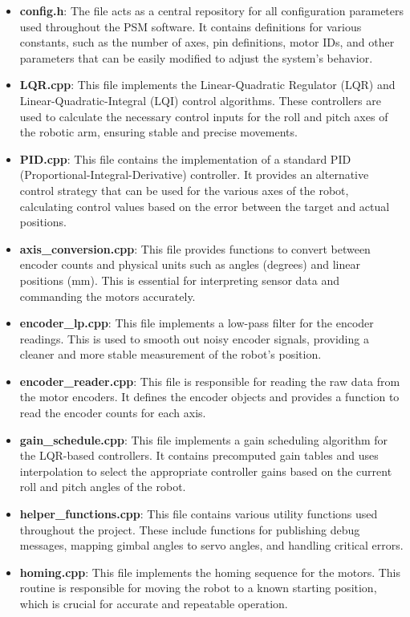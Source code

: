 \begin{itemize}
    \item \textbf{config.h}: The file acts as a central repository for all configuration parameters used throughout the PSM software. It contains definitions for various constants, such as the number of axes, pin definitions, motor IDs, and other parameters that can be easily modified to adjust the system's behavior.
    \item \textbf{LQR.cpp}: This file implements the Linear-Quadratic Regulator (LQR) and Linear-Quadratic-Integral (LQI) control algorithms. These controllers are used to calculate the necessary control inputs for the roll and pitch axes of the robotic arm, ensuring stable and precise movements.
    \item \textbf{PID.cpp}: This file contains the implementation of a standard PID (Proportional-Integral-Derivative) controller. It provides an alternative control strategy that can be used for the various axes of the robot, calculating control values based on the error between the target and actual positions.
    \item \textbf{axis\_conversion.cpp}: This file provides functions to convert between encoder counts and physical units such as angles (degrees) and linear positions (mm). This is essential for interpreting sensor data and commanding the motors accurately.
    \item \textbf{encoder\_lp.cpp}: This file implements a low-pass filter for the encoder readings. This is used to smooth out noisy encoder signals, providing a cleaner and more stable measurement of the robot's position.
    \item \textbf{encoder\_reader.cpp}: This file is responsible for reading the raw data from the motor encoders. It defines the encoder objects and provides a function to read the encoder counts for each axis.
    \item \textbf{gain\_schedule.cpp}: This file implements a gain scheduling algorithm for the LQR-based controllers. It contains precomputed gain tables and uses interpolation to select the appropriate controller gains based on the current roll and pitch angles of the robot.
    \item \textbf{helper\_functions.cpp}: This file contains various utility functions used throughout the project. These include functions for publishing debug messages, mapping gimbal angles to servo angles, and handling critical errors.
    \item \textbf{homing.cpp}: This file implements the homing sequence for the motors. This routine is responsible for moving the robot to a known starting position, which is crucial for accurate and repeatable operation.

\end{itemize}
